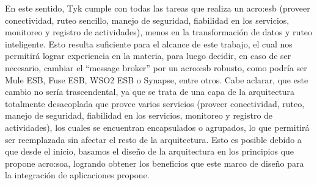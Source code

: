 En este sentido, Tyk cumple con todas las tareas que realiza un \gls{acro:esb} (proveer conectividad, ruteo sencillo, manejo de seguridad, fiabilidad en los servicios, monitoreo y registro de actividades), menos en la transformación de datos y ruteo inteligente.  Esto resulta suficiente para el alcance de este trabajo, el cual nos permitirá lograr experiencia en la materia, para luego decidir, en caso de ser necesario, cambiar el ``message broker'' por un \gls{acro:esb} robusto, como podría ser Mule ESB, Fuse ESB, WSO2 ESB o Synapse, entre otros.  Cabe aclarar, que este cambio no sería trascendental, ya que se trata de una capa de la arquitectura totalmente desacoplada que provee varios servicios (proveer conectividad, ruteo, manejo de seguridad, fiabilidad en los servicios, monitoreo y registro de actividades), los cuales se encuentran encapsulados o agrupados, lo que permitirá ser reemplazada sin afectar el resto de la arquitectura.  Esto es posible debido a que desde el inicio, basamos el diseño de la arquitectura en los principios que propone \gls{acro:soa}, logrando obtener los beneficios que este marco de diseño para la integración de aplicaciones propone.
